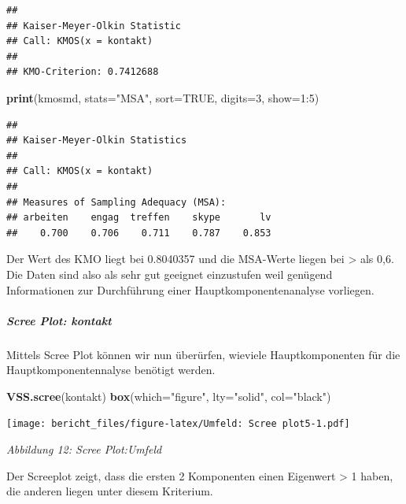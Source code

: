 \documentclass[]{article}
\newenvironment{Shaded}{\begin{snugshade}}{\end{snugshade}}
\newcommand{\KeywordTok}[1]{\textcolor[rgb]{0.13,0.29,0.53}{\textbf{{#1}}}}
\newcommand{\DataTypeTok}[1]{\textcolor[rgb]{0.13,0.29,0.53}{{#1}}}
\newcommand{\DecValTok}[1]{\textcolor[rgb]{0.00,0.00,0.81}{{#1}}}
\newcommand{\StringTok}[1]{\textcolor[rgb]{0.31,0.60,0.02}{{#1}}}
\newcommand{\OtherTok}[1]{\textcolor[rgb]{0.56,0.35,0.01}{{#1}}}
\newcommand{\NormalTok}[1]{{#1}}
\let\oldsubparagraph\subparagraph
\renewcommand{\subparagraph}[1]{\oldsubparagraph{#1}\mbox{}}
\begin{document}
\begin{verbatim}
## 
## Kaiser-Meyer-Olkin Statistic
## Call: KMOS(x = kontakt)
## 
## KMO-Criterion: 0.7412688
\end{verbatim}

\begin{Shaded}
\begin{Highlighting}[]
\KeywordTok{print}\NormalTok{(kmosmd, }\DataTypeTok{stats=}\StringTok{"MSA"}\NormalTok{, }\DataTypeTok{sort=}\OtherTok{TRUE}\NormalTok{, }\DataTypeTok{digits=}\DecValTok{3}\NormalTok{, }\DataTypeTok{show=}\DecValTok{1}\NormalTok{:}\DecValTok{5}\NormalTok{)}
\end{Highlighting}
\end{Shaded}

\begin{verbatim}
## 
## Kaiser-Meyer-Olkin Statistics
## 
## Call: KMOS(x = kontakt)
## 
## Measures of Sampling Adequacy (MSA):
## arbeiten    engag  treffen    skype       lv 
##    0.700    0.706    0.711    0.787    0.853
\end{verbatim}

Der Wert des KMO liegt bei 0.8040357 und die MSA-Werte liegen bei
\textgreater{} als 0,6. Die Daten sind also als sehr gut geeignet
einzustufen weil genügend Informationen zur Durchführung einer
Hauptkomponentenanalyse vorliegen.

\subparagraph{Scree Plot: kontakt}\label{scree-plot-kontakt}

Mittels Scree Plot können wir nun überürfen, wieviele Hauptkomponenten
für die Hauptkomponentennalyse benötigt werden.

\begin{Shaded}
\begin{Highlighting}[]
\KeywordTok{VSS.scree}\NormalTok{(kontakt)}
\KeywordTok{box}\NormalTok{(}\DataTypeTok{which=}\StringTok{"figure"}\NormalTok{, }\DataTypeTok{lty=}\StringTok{"solid"}\NormalTok{, }\DataTypeTok{col=}\StringTok{"black"}\NormalTok{)}
\end{Highlighting}
\end{Shaded}

\texttt{[image: bericht\_files/figure-latex/Umfeld: Scree plot5-1.pdf]}

\begin{center}
\textit{Abbildung 12: Scree Plot:Umfeld}
\bigskip
\end{center}

Der Screeplot zeigt, dass die ersten 2 Komponenten einen Eigenwert
\textgreater{} 1 haben, die anderen liegen unter diesem Kriterium.
\end{document}
